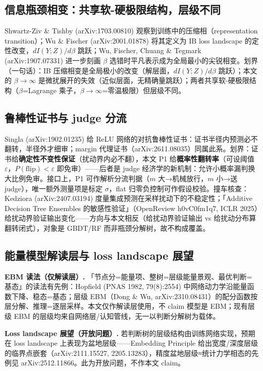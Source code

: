 \documentclass[12pt]{ctexart}
\newcommand{\flip}{\mathrm{flip}}
\begin{document}
\subsection{信息瓶颈相变：共享软-硬极限结构，层级不同}

Shwartz-Ziv \& Tishby (arXiv:1703.00810) 观察到训练中的压缩相（representation transition）；Wu \& Fischer (arXiv:2001.01878) 将其定义为 IB loss landscape 的定性改变，$dI(Y;Z)/d\beta$ 跳跃；Wu, Fischer, Chuang \& Tegmark (arXiv:1907.07331) 进一步刻画 $\beta$ 选错时平凡表示成为全局最小的尖锐相变。划界（一句话）：IB 压缩相变是全局极小的改变（解层面，$dI(Y;Z)/d\beta$ 跳跃）；本文的 $\beta\to\infty$ 是微扰展开的失效（近似层面，无精确量跳跃）；两者共享软-硬极限结构（$\beta$=Lagrange 乘子，$\beta\to\infty$=零温极限）但层级不同。

\subsection{鲁棒性证书与 judge 分流}

Singla (arXiv:1902.01235) 给 ReLU 网络的对抗鲁棒性证书：证书半径内预测必不翻转，半径外才细审；margin 代理证书（arXiv:2611.08035）同属此系。划界：证书给\textbf{确定性不变性保证}（扰动界内必不翻），本文 P1 给\textbf{概率性翻转率}（可设阈值 $\varepsilon$，$P(\flip)<\varepsilon$ 即免审）——后者是 judge 经济学的新机制：允许小概率漏判换大比例免审。接口上，P1 可作解析分流判据（$m$ 大→机械放行，$m$ 小→送 judge），唯一额外测量项是标定 $\sigma$，flat 归零负控制可作假设校验。撞车核查：Kedziora (arXiv:2407.03194) 度量集成预测在采样扰动下的不稳定性；「Additive Decision Tree Ensembles 的敏感性验证」（OpenReview h0vC0fm1q7, ICLR 2025）给扰动界验证输出变化——方向与本文相反（给扰动界验证输出 vs 给扰动分布算翻转闭式），对象是 GBDT/RF 而非瓶颈分解树，故不构成覆盖。

\subsection{能量模型解读层与 loss landscape 展望}

\textbf{EBM 读法（仅解读层）.} 「节点分=能量项、整树=层级能量景观、最优判断=基态」的读法有先例：Hopfield (PNAS 1982, 79(8):2554) 中网络动力学沿能量函数下降、稳态=基态；层级 EBM（Dong \& Wu, arXiv:2310.08431）的配分函数按层分解、推理=逐层采样。本文仅作解读层使用，不 claim 模型是 EBM；现有层级 EBM 的层级均来自网络层/认知管线，无一以判断分解树为载体。

\textbf{Loss landscape 展望（开放问题）.} 若判断树的层级结构由训练网络实现，预期在 loss landscape 上表现为盆地层级——Embedding Principle 给出宽度/深度层级的临界点嵌套（arXiv:2111.15527, 2205.13283），精度盆地层级≈统计力学相态的先例见 arXiv:2512.11866。此为开放问题，不作本文 claim。
\end{document}
